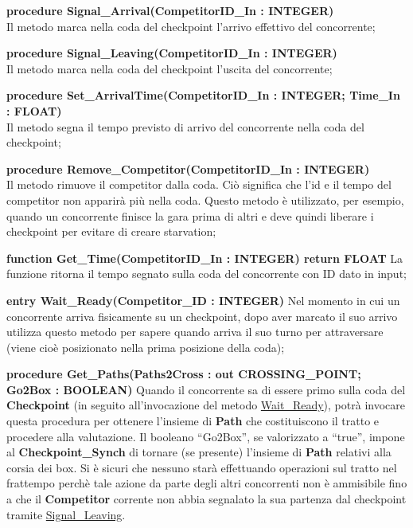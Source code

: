 \begin{description}
\item{\textbf{procedure Signal\_Arrival(CompetitorID\_In : INTEGER)}}\\
Il metodo marca nella coda del checkpoint l'arrivo effettivo del concorrente;
\item{\textbf{procedure Signal\_Leaving(CompetitorID\_In : INTEGER)}}\\
Il metodo marca nella coda del checkpoint l'uscita del concorrente;
\item{\textbf{procedure Set\_ArrivalTime(CompetitorID\_In : INTEGER; Time\_In : FLOAT)}}\\
Il metodo segna il tempo previsto di arrivo del concorrente nella coda del checkpoint;
\item{\textbf{procedure Remove\_Competitor(CompetitorID\_In : INTEGER)}}\\
Il metodo rimuove il competitor dalla coda. Ci\`{o} significa che l'id e il tempo del competitor non apparir\`{a} pi\`{u}
nella coda. Questo metodo \`{e} utilizzato, per esempio, quando un concorrente finisce la gara prima di altri
e deve quindi liberare i checkpoint per evitare di creare starvation;
\item{\textbf{function Get\_Time(CompetitorID\_In : INTEGER) return FLOAT}}
La funzione ritorna il tempo segnato sulla coda del concorrente con ID dato in input;
\item{\textbf{entry Wait\_Ready(Competitor\_ID : INTEGER)}}
Nel momento in cui un concorrente arriva fisicamente su un checkpoint, dopo aver marcato il suo arrivo
utilizza questo metodo per sapere quando arriva il suo turno per attraversare (viene cio\`{e} posizionato nella prima posizione della coda);
\item{\textbf{procedure Get\_Paths(Paths2Cross : out CROSSING\_POINT;  Go2Box : BOOLEAN)}}
Quando il concorrente sa di essere primo sulla coda del \textbf{Checkpoint}
(in seguito all'invocazione del metodo \underline{Wait\_Ready}), potr\`{a} invocare questa procedura per
ottenere l'insieme di \textbf{Path} che costituiscono il tratto e procedere alla valutazione. Il booleano ``Go2Box'', se valorizzato a ``true'',
impone al \textbf{Checkpoint\_Synch} di tornare (se presente) l'insieme di \textbf{Path} relativi alla corsia dei box.
Si \`{e} sicuri che nessuno star\`{a} effettuando operazioni sul tratto nel frattempo perch\`{e} tale azione da parte
degli altri concorrenti non \`{e} ammisibile fino a che il \textbf{Competitor} corrente non abbia segnalato la sua partenza dal checkpoint
tramite \underline{Signal\_Leaving}.
\end{description}
